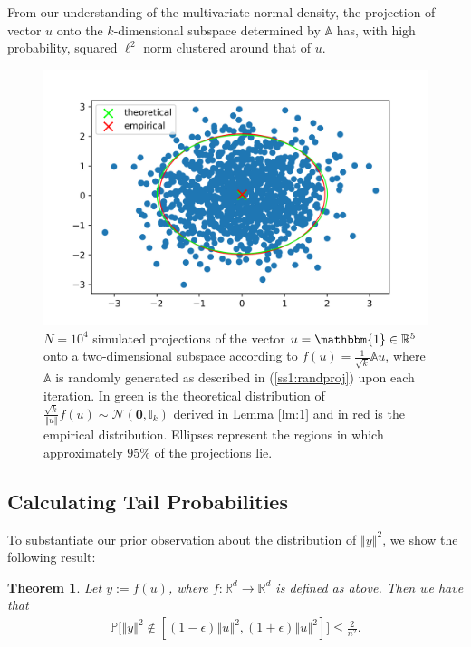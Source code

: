 \documentclass{article}
\newtheorem{theorem}{Theorem}
\begin{document}
    From our understanding of the multivariate normal density, the projection of vector $u$ onto the  $k$-dimensional subspace determined by $\mathbb{A}$ has, with high probability, squared $\ell^2$ norm clustered around that of $u$.
    \begin{figure}[H]
        \centering
        \includegraphics[width=\textwidth]{imgs/projectpts2d.png}
        \caption{$N = 10^4$ simulated projections of the vector $u = \mathbbm{1} \in \mathbb{R}^5$ onto a two-dimensional subspace according to $f(u) = \frac{1}{\sqrt{k}}\mathbb{A}u$, where $\mathbb{A}$ is randomly generated as described in (\ref{ss1:randproj}) upon each iteration. In green is the theoretical distribution of $\frac{\sqrt{k}}{\left \Vert u \right \Vert}f(u) \sim \mathcal{N}(\boldsymbol{0}, \mathbb{I}_k)$ derived in Lemma \ref{lm:1} and in red is the empirical distribution. Ellipses represent the regions in which approximately $95$\% of the projections lie.}
    \end{figure}
    
\subsection{Calculating Tail Probabilities}

To substantiate our prior observation about the distribution of $\left \Vert y \right \Vert^2$, we show the following result:

\begin{theorem}\label{thm:2}
    Let $y:= f(u)$, where $f: \mathbb{R}^d \rightarrow \mathbb{R}^d$ is defined as above. Then we have that 
    \begin{align*}
        \mathbb{P}\bigg[ \left\Vert y \right\Vert^2 \notin \left[(1 - \epsilon)\left\Vert u \right\Vert^2, (1 + \epsilon)\left\Vert u \right\Vert^2 \right] \bigg] \leq \frac{2}{n^2}.
    \end{align*}
\end{theorem}
\end{document}
